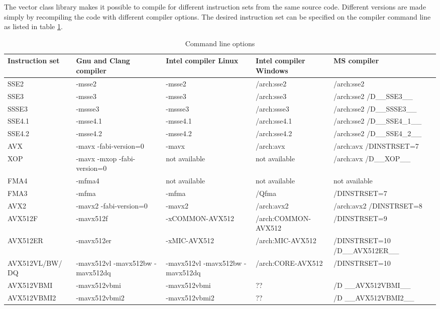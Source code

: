 \documentclass[vcl_manual.tex]{subfiles}
\begin{document}
The vector class library makes it possible to compile for different instruction sets from the same source code. Different versions are made simply by recompiling the code with different compiler options. The desired instruction set can be specified on the compiler command line as listed in table \ref{table:CommandLineOptions}.

\begin {table}[h]
\caption{Command line options}
\label{table:CommandLineOptions}
\begin{tabular}{|p{26mm}|p{28mm}|p{28mm}|p{28mm}|p{28mm}|}
\hline
\bfseries Instruction set & \bfseries Gnu and Clang compiler & \bfseries Intel compiler Linux & \bfseries Intel compiler Windows & \bfseries MS compiler \\ \hline

SSE2 & -msse2 & -msse2 & /arch:sse2 & /arch:sse2 \\ \hline
SSE3 & -msse3 & -msse3 & /arch:sse3 & /arch:sse2 \newline /D\_\_SSE3\_\_ \\ \hline
SSSE3 & -mssse3 & -mssse3 & /arch:ssse3 & /arch:sse2 \newline /D\_\_SSSE3\_\_ \\ \hline
SSE4.1 & -msse4.1 & -msse4.1 & /arch:sse4.1 & /arch:sse2 \newline /D\_\_SSE4\_1\_\_ \\ \hline
SSE4.2 & -msse4.2 & -msse4.2 & /arch:sse4.2 & /arch:sse2 \newline /D\_\_SSE4\_2\_\_ \\ \hline
AVX & -mavx \newline -fabi-version=0 & -mavx & /arch:avx & /arch:avx /DINSTRSET=7 \\ \hline
XOP & -mavx \newline -mxop \newline -fabi-version=0 & not available & not available & /arch:avx \newline /D\_\_XOP\_\_ \\ \hline
FMA4 & -mfma4 & not available & not available & not available \\ \hline
FMA3 & -mfma & -mfma & /Qfma & /DINSTRSET=7 \\ \hline
AVX2 & -mavx2 \newline -fabi-version=0 & -mavx2 & /arch:avx2 & /arch:avx2 \newline /DINSTRSET=8 \\ \hline
AVX512F & -mavx512f & -xCOMMON-AVX512 & /arch:COMMON-AVX512 & /DINSTRSET=9 \\ \hline
AVX512ER & -mavx512er & -xMIC-AVX512 & /arch:MIC-AVX512 & /DINSTRSET=10 /D\_\_AVX512ER\_\_ \\ \hline
AVX512VL/BW/ DQ & -mavx512vl -mavx512bw -mavx512dq & -mavx512vl -mavx512bw -mavx512dq & /arch:CORE-AVX512 & /DINSTRSET=10 \\ \hline
AVX512VBMI & -mavx512vbmi & -mavx512vbmi & ?? & /D \_\_AVX512VBMI\_\_ \\ \hline
AVX512VBMI2 & -mavx512vbmi2 & -mavx512vbmi2 & ?? & /D \_\_AVX512VBMI2\_\_ \\ \hline
\end{tabular}
\end{table}
\end{document}
